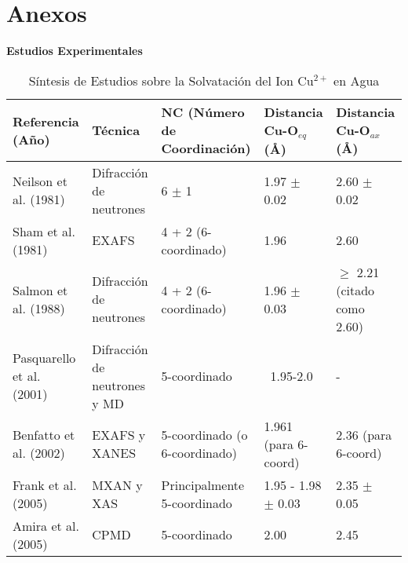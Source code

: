 
\chapter{Anexos}

\begin{sidewaystable}
    \centering
    \caption{Síntesis de Estudios sobre la Solvatación del Ion Cu$^{2+}$ en Agua}
    \label{tab:agua-paramteros-estructurales-experimentales-y-teoricos}
    {\scriptsize %
    
    \textbf{Estudios Experimentales}
    \vspace{2mm} %
    
    \begin{tabular}{@{}lllll@{}}
        \toprule
        \textbf{Referencia (Año)} & \textbf{Técnica} & \textbf{NC (Número de Coordinación)} & \textbf{Distancia Cu-O$_{eq}$ (\AA)} & \textbf{Distancia Cu-O$_{ax}$ (\AA)} \\
        \midrule
        Neilson et al. (1981)   & Difracción de neutrones & 6 $\pm$ 1                              & 1.97 $\pm$ 0.02                      & 2.60 $\pm$ 0.02                                 \\
        Sham et al. (1981)      & EXAFS                   & 4 + 2 (6-coordinado)                   & 1.96                                 & 2.60                                            \\
        Salmon et al. (1988)    & Difracción de neutrones & 4 + 2 (6-coordinado)                   & 1.96 $\pm$ 0.03                      & $\geq$ 2.21 (citado como 2.60)                  \\
        Pasquarello et al. (2001) & Difracción de neutrones y MD & 5-coordinado                           & ~1.95-2.0                            & -                                               \\
        Benfatto et al. (2002)  & EXAFS y XANES           & 5-coordinado (o 6-coordinado)          & 1.961 (para 6-coord)                 & 2.36 (para 6-coord)                             \\
        Frank et al. (2005)     & MXAN y XAS              & Principalmente 5-coordinado          & 1.95 - 1.98 $\pm$ 0.03               & 2.35 $\pm$ 0.05                                 \\
        Amira et al. (2005)     & CPMD                    & 5-coordinado                           & 2.00                                 & 2.45                                            \\

\end{tabular}}
\end{sidewaystable}
